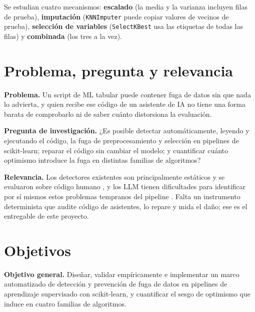 Se estudian cuatro mecanismos: \textbf{escalado} (la media y la varianza incluyen filas de prueba), \textbf{imputación} (\texttt{KNNImputer} puede copiar valores de vecinos de prueba), \textbf{selección de variables} (\texttt{SelectKBest} usa las etiquetas de todas las filas) y \textbf{combinada} (los tres a la vez).

\section{Problema, pregunta y relevancia}

\textbf{Problema.} Un script de ML tabular puede contener fuga de datos sin que nada lo advierta, y quien recibe ese código de un asistente de IA no tiene una forma barata de comprobarlo ni de saber cuánto distorsiona la evaluación.

\textbf{Pregunta de investigación.} ¿Es posible detectar automáticamente, leyendo y ejecutando el código, la fuga de preprocesamiento y selección en pipelines de scikit-learn; reparar el código sin cambiar el modelo; y cuantificar cuánto optimismo introduce la fuga en distintas familias de algoritmos?

\textbf{Relevancia.} Los detectores existentes son principalmente estáticos y se evaluaron sobre código humano \parencite{yang2022,drobnjakovic2024,alomar2025}, y los LLM tienen dificultades para identificar por sí mismos estos problemas tempranos del pipeline \parencite{kumar2025}. Falta un instrumento determinista que audite código de asistentes, lo repare y mida el daño; ese es el entregable de este proyecto.

\section{Objetivos}

\textbf{Objetivo general.} Diseñar, validar empíricamente e implementar un marco automatizado de detección y prevención de fuga de datos en pipelines de aprendizaje supervisado con scikit-learn, y cuantificar el sesgo de optimismo que induce en cuatro familias de algoritmos.

